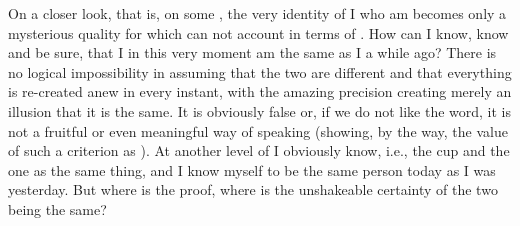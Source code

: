 On a closer look, that is, on some , the very identity of I
who am  becomes only a mysterious quality for which
 can not account in terms of . How can I know,
 know and be sure, that
I  in this very moment am the same as I a while ago? There is no
logical impossibility in assuming that the two are different and that everything
is re-created anew in every instant, with the amazing precision creating merely
an illusion that it is the same.
It is obviously false or, if we do not like the word, it is not a fruitful or
even meaningful way of speaking (showing, by the way, the value of such a
criterion as ). At another level of  I
obviously know, i.e.,  the cup  and the one
 as the same thing, and I know myself to be the same person
today as I was yesterday.  But where is the proof, where is the unshakeable
certainty of the two being the same?

